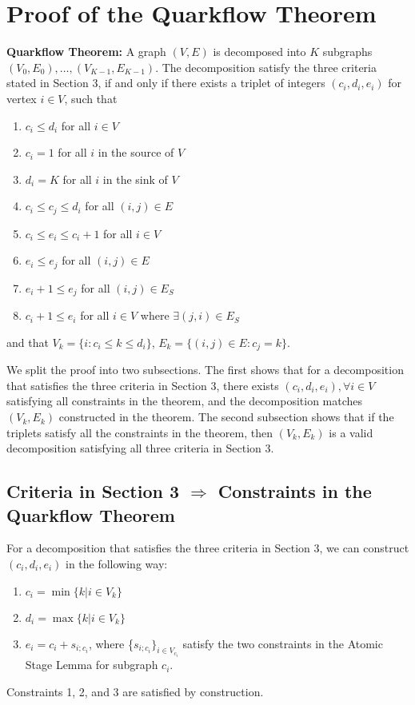 \documentclass[review]{siamart0216}
\begin{document}
\section{Proof of the Quarkflow Theorem}

{\bf Quarkflow Theorem:} 
A graph $(V,E)$ is decomposed into $K$ subgraphs $(V_0,E_0), \ldots,
(V_{K-1},E_{K-1})$.
The decomposition satisfy the three criteria stated
in Section 3, if and only if there exists a triplet of integers
$(c_i, d_i, e_i)$ for vertex $i\in V$, such that
\begin{enumerate}
    \item $c_i \le d_i$ for all $i\in V$
    \item $c_i = 1$ for all $i$ in the source of $V$
    \item $d_i = K$ for all $i$ in the sink of $V$
    \item $c_i \le c_j \le d_i$ for all $(i,j)\in E$
    \item $c_i \le e_i \le c_i + 1$ for all $i\in V$
    \item $e_i \le e_j$ for all $(i,j)\in E$
    \item $e_i + 1 \le e_j$ for all $(i,j)\in E_S$
    \item $c_i + 1 \le e_i$ for all $i\in V$ where $\exists (j,i)\in E_S$
\end{enumerate}
and that $V_k=\{i : c_i\le k\le d_i\}$, $E_k=\{(i,j)\in E : c_j=k\}$.


We split the proof into two subsections.  The first shows that 
for a decomposition that satisfies the three criteria in Section 3,
there exists $(c_i,d_i,e_i),\forall i\in V$ satisfying
all constraints in the theorem, and the decomposition matches $(V_k,E_k)$
constructed in the theorem.  The second subsection shows that
if the triplets satisfy all the constraints in the theorem, then 
$(V_k,E_k)$ is a valid decomposition satisfying all three criteria
in Section 3.

\subsection{Criteria in Section 3 $\Longrightarrow$
Constraints in the Quarkflow Theorem}
For a decomposition that satisfies the three criteria in Section 3,
we can construct $(c_i,d_i,e_i)$ in the following way:
\begin{enumerate}
    \item $c_i = \min \{ k | i\in V_k \}$
    \item $d_i = \max \{ k | i\in V_k \}$
    \item $e_i = c_i + s_{i;c_i}$, where \{$s_{i;c_i}\}_{i\in V_{c_i}}$
        satisfy the two constraints in the Atomic
        Stage Lemma for subgraph $c_i$.
\end{enumerate}
Constraints 1, 2, and 3 are satisfied by construction.
\end{document}
